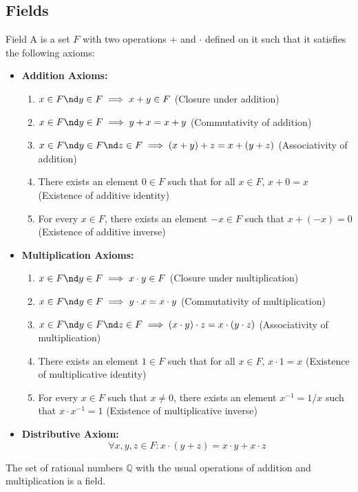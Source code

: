 \documentclass[openany]{book}
\begin{document}
\subsection{Fields}
\begin{mydefinition}{Field}
    A  is a set $F$ with two operations $+$ and $\cdot$ defined on it such that it satisfies the following axioms: 
    \begin{itemize}
    \item \textbf{Addition Axioms:}
        \begin{enumerate}
            \item $x \in F \nd y \in F \implies x + y \in F$ (Closure under addition)
            \item $x \in F \nd y \in F \implies y + x = x + y$ (Commutativity of addition)
            \item $x \in F \nd y \in F \nd z \in F \implies (x + y) + z = x + (y + z)$ (Associativity of addition)
            \item There exists an element $0 \in F$ such that for all $x \in F$, $x + 0 = x$ (Existence of additive identity)
            \item For every $x \in F$, there exists an element $-x \in F$ such that $x + (-x) = 0$ (Existence of additive inverse)
        \end{enumerate}
    \item \textbf{Multiplication Axioms:}
        \begin{enumerate}
            \item $x \in F \nd y \in F \implies x \cdot y \in F$ (Closure under multiplication)
            \item $x \in F \nd y \in F \implies y \cdot x = x \cdot y$ (Commutativity of multiplication)
            \item $x \in F \nd y \in F \nd z \in F \implies (x \cdot y) \cdot z = x \cdot (y \cdot z)$ (Associativity of multiplication)
            \item There exists an element $1 \in F$ such that for all $x \in F$, $x \cdot 1 = x$ (Existence of multiplicative identity)
            \item For every $x \in F$ such that $x \neq 0$, there exists an element $x^{-1} = 1/x$ such that $x \cdot x^{-1} = 1$ (Existence of multiplicative inverse)
        \end{enumerate}
    \item \textbf{Distributive Axiom:} $$\forall x, y, z \in F: x \cdot (y + z) = x \cdot y + x \cdot z$$   
    \end{itemize}
    \begin{example}
        The set of rational numbers $\mathbb{Q}$ with the usual operations of addition and multiplication is a field.
    \end{example}
\end{mydefinition}
\end{document}
